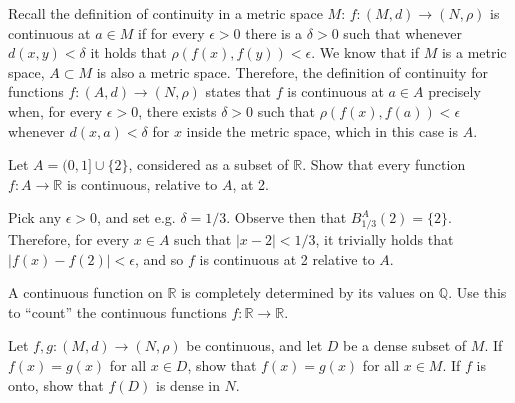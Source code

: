 \begin{solution}
    
    Recall the definition of continuity in a metric space $M$: $f: (M, d) \rightarrow (N, \rho)$ is continuous at $a \in M$ if for every $\epsilon > 0$ there is a $\delta > 0$ such that whenever $d(x, y) < \delta$ it holds that $\rho(f(x), f(y)) < \epsilon$.
    We know that if $M$ is a metric space, $A \subset M$ is also a metric space.
    Therefore, the definition of continuity for functions $f: (A, d) \rightarrow (N, \rho)$ states that $f$ is continuous at $a \in A$ precisely when, for every $\epsilon > 0$, there exists $\delta > 0$ such that $\rho(f(x), f(a)) < \epsilon$ whenever $d(x, a) < \delta$ for $x$ inside the metric space, which in this case is $A$.
\end{solution}

\begin{exercise}{10}
    Let $A = (0, 1] \cup \{2\}$, considered as a subset of $\mathbb{R}$.
    Show that every function $f: A \rightarrow \mathbb{R}$ is continuous, relative to $A$, at 2.
\end{exercise}

\begin{solution}
    
    Pick any $\epsilon > 0$, and set e.g. $\delta = 1/3$.
    Observe then that $B_{1/3}^{A}(2) = \{2\}$.
    Therefore, for every $x \in A$ such that $\lvert x - 2 \rvert < 1/3$, it trivially holds that $\lvert f(x) - f(2) \rvert < \epsilon$, and so $f$ is continuous at 2 relative to $A$.
\end{solution}

\begin{exercise}{14}
    A continuous function on $\mathbb{R}$ is completely determined by its values on $\mathbb{Q}$.
    Use this to ``count'' the continuous functions $f: \mathbb{R} \rightarrow \mathbb{R}$.
\end{exercise}

\begin{solution}
    

\end{solution}

\begin{exercise}{17}
    Let $f, g: (M, d) \rightarrow (N, \rho)$ be continuous, and let $D$ be a dense subset of $M$.
    If $f(x) = g(x)$ for all $x \in D$, show that $f(x) = g(x)$ for all $x \in M$.
    If $f$ is onto, show that $f(D)$ is dense in $N$.
\end{exercise}

